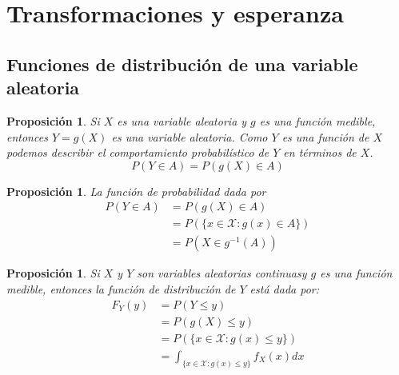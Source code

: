 \documentclass[14pt]{extarticle}
\newtheorem{proposition}[theorem]{Proposición}
\begin{document}

\section{Transformaciones y esperanza}
\subsection{Funciones de distribución de una variable aleatoria}

\begin{proposition}
    Si $X$ es una variable aleatoria y $g$ es una función medible, entonces $Y = g(X)$ es una variable aleatoria.
    Como $Y$ es una función de $X$ podemos describir el comportamiento probabilístico de $Y$ en términos de $X$.
    \[
        P(Y \in A) = P(g(X) \in A) 
    \]
\end{proposition}

\begin{proposition}
    La función de probabilidad dada por 
    \begin{align*}
        P(Y\in A) &= P(g(X) \in A)\\
        &= P(\{ x \in \mathcal{X}: g(x) \in A\})\\
        &= P(X \in g^{-1}(A))
    \end{align*}        
\end{proposition}

\begin{proposition}
    Si $X$ y $Y$ son variables aleatorias continuasy $g$ es una función medible, entonces la función de distribución de $Y$ está dada por:
    \begin{align*}
        F_Y(y) &= P(Y \leq y)\\
        &= P(g(X) \leq y)\\
        &= P(\{x \in \mathcal{X}: g(x) \leq y\})\\
        &= \int_{\{x \in \mathcal{X}: g(x) \leq y\}} f_X(x) dx
    \end{align*}    
\end{proposition}
\end{document}
